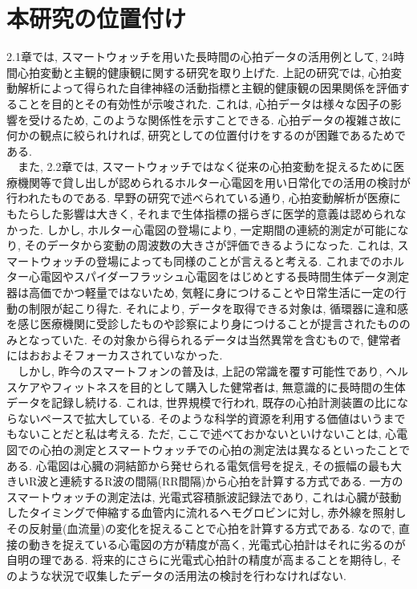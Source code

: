 \documentclass[report, 11pt, a4paper]{jsbook}
\begin{document}
\section{本研究の位置付け}
2.1章では, スマートウォッチを用いた長時間の心拍データの活用例として, 24時間心拍変動と主観的健康観に関する研究を取り上げた. 上記の研究では, 心拍変動解析によって得られた自律神経の活動指標と主観的健康観の因果関係を評価することを目的とその有効性が示唆された. これは, 心拍データは様々な因子の影響を受けるため, このような関係性を示すことできる. 心拍データの複雑さ故に何かの観点に絞られければ, 研究としての位置付けをするのが困難であるためである.\\
~~また, 2.2章では, スマートウォッチではなく従来の心拍変動を捉えるために医療機関等で貸し出しが認められるホルター心電図を用い日常化での活用の検討が行われたものである. 早野の研究で述べられている通り, 心拍変動解析が医療にもたらした影響は大きく, それまで生体指標の揺らぎに医学的意義は認められなかった. しかし, ホルター心電図の登場により, 一定期間の連続的測定が可能になり, そのデータから変動の周波数の大きさが評価できるようになった. これは, スマートウォッチの登場によっても同様のことが言えると考える. これまでのホルター心電図やスパイダーフラッシュ心電図をはじめとする長時間生体データ測定器は高価でかつ軽量ではないため, 気軽に身につけることや日常生活に一定の行動の制限が起こり得た. それにより, データを取得できる対象は, 循環器に違和感を感じ医療機関に受診したものや診察により身につけることが提言されたもののみとなっていた. その対象から得られるデータは当然異常を含むもので, 健常者にはおおよそフォーカスされていなかった. \\
~~しかし, 昨今のスマートフォンの普及は, 上記の常識を覆す可能性であり, ヘルスケアやフィットネスを目的として購入した健常者は, 無意識的に長時間の生体データを記録し続ける. これは, 世界規模で行われ, 既存の心拍計測装置の比にならないペースで拡大している. そのような科学的資源を利用する価値はいうまでもないことだと私は考える. ただ, ここで述べておかないといけないことは, 心電図での心拍の測定とスマートウォッチでの心拍の測定法は異なるといったことである. 心電図は心臓の洞結節から発せられる電気信号を捉え, その振幅の最も大きいR波と連続するR波の間隔(RR間隔)から心拍を計算する方式である. 一方のスマートウォッチの測定法は, 光電式容積脈波記録法であり, これは心臓が鼓動したタイミングで伸縮する血管内に流れるヘモグロビンに対し, 赤外線を照射しその反射量(血流量)の変化を捉えることで心拍を計算する方式である. なので, 直接の動きを捉えている心電図の方が精度が高く, 光電式心拍計はそれに劣るのが自明の理である. 将来的にさらに光電式心拍計の精度が高まることを期待し, そのような状況で収集したデータの活用法の検討を行わなければない.\\
\end{document}
